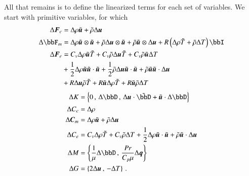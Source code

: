 \documentclass[preprint,12pt]{elsarticle}
\begin{document}
All that remains is to define the linearized terms for each set of variables.
We start with primitive variables, for which
\begin{align*}
\Delta\bfF_c&=\Delta\rho\tilde\bfu+\tilde\rho\Delta\bfu\\
\Delta\bbF_m&=\Delta\rho\tilde\bfu\otimes\tilde\bfu+\tilde\rho\Delta\bfu\otimes\tilde\bfu+\tilde\rho\tilde\bfu\otimes\Delta\bfu
+R\LRp{\Delta\rho\tilde T+\tilde\rho\Delta T}\bbI\\
\Delta\bfF_e&=C_v\Delta\rho\tilde\bfu\tilde T+C_v\tilde\rho\Delta\bfu\tilde T+C_v\tilde\rho\tilde\bfu\Delta T\\
&+\frac{1}{2}\Delta\rho\tilde\bfu\tilde\bfu\cdot\tilde\bfu
+\frac{1}{2}\tilde\rho\Delta\bfu\tilde\bfu\cdot\tilde\bfu
+\tilde\rho\tilde\bfu\tilde\bfu\cdot\Delta\bfu\\
&+R\Delta\bfu\tilde\rho\tilde T
+R\tilde\bfu\Delta\rho\tilde T
+R\tilde\bfu\tilde\rho\Delta T\\
\end{align*}
\begin{align*}
\Delta K&=\LRc{0\,,\,
\Delta\bbD\,,\,
\Delta\bfu\cdot\tilde\bbD+\tilde\bfu\cdot\Delta\bbD}\\
\Delta C_c&=\Delta\rho\\
\Delta\bfC_m&=\Delta\rho\tilde\bfu+\tilde\rho\Delta\bfu\\
\Delta C_e&=C_v\Delta\rho\tilde T+C_v\tilde\rho\Delta T
+\frac{1}{2}\Delta\rho\tilde\bfu\cdot\tilde\bfu+\tilde\rho\tilde\bfu\cdot\Delta\bfu\\
\Delta M&=\LRc{\frac{1}{\mu}\Delta \bbD\,,\,\frac{Pr}{C_p\mu}\Delta\bfq}\\
\Delta G&=\LRc{2\Delta\bfu\,,\,-\Delta T}\,.
\end{align*}
\end{document}
